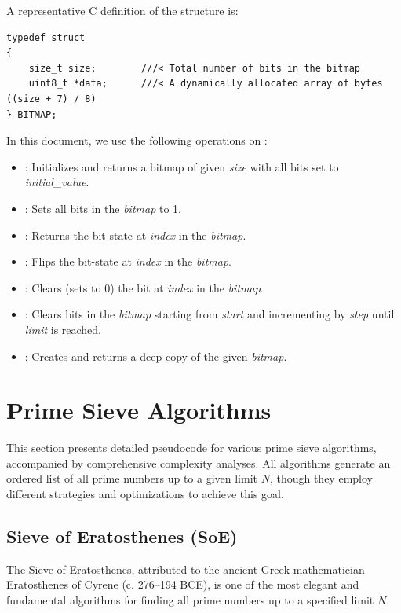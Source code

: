\documentclass{article}
\begin{document}
A representative C definition of the  structure is:
\begin{verbatim}
typedef struct
{
    size_t size;        ///< Total number of bits in the bitmap
    uint8_t *data;      ///< A dynamically allocated array of bytes ((size + 7) / 8)
} BITMAP;
\end{verbatim}
In this document, we use the following operations on :
\begin{itemize}[noitemsep]
    \item {}: Initializes and returns a bitmap of given \emph{size} with all bits set to \emph{initial\_value}.
    \item {}: Sets all bits in the \emph{bitmap} to 1.
    \item {}: Returns the bit-state at \emph{index} in the \emph{bitmap}.
    \item {}: Flips the bit-state at \emph{index} in the \emph{bitmap}.
    \item {}: Clears (sets to 0) the bit at \emph{index} in the \emph{bitmap}.
    \item {}: Clears bits in the \emph{bitmap} starting from \emph{start} and incrementing by \emph{step} until \emph{limit} is reached.
    \item {}: Creates and returns a deep copy of the given \emph{bitmap}.
\end{itemize}

\section{Prime Sieve Algorithms}

This section presents detailed pseudocode for various prime sieve algorithms, accompanied by comprehensive complexity analyses. All algorithms generate an ordered list of all prime numbers up to a given limit $N$, though they employ different strategies and optimizations to achieve this goal.

\subsection{Sieve of Eratosthenes (SoE)} \label{alg:soe}

The Sieve of Eratosthenes, attributed to the ancient Greek mathematician Eratosthenes of Cyrene (c. 276--194 BCE), is one of the most elegant and fundamental algorithms for finding all prime numbers up to a specified limit $N$. 
\end{document}
